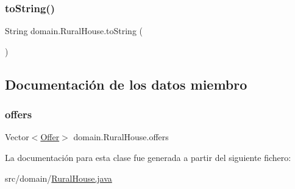 \mbox{\label{classdomain_1_1_rural_house_a2937650ac9e726b75be724d264fa1bee}} 
\subsubsection{\texorpdfstring{toString()}{toString()}}
{\footnotesize\ttfamily String domain.\+Rural\+House.\+to\+String (\begin{DoxyParamCaption}{ }\end{DoxyParamCaption})}



\subsection{Documentación de los datos miembro}
\mbox{\label{classdomain_1_1_rural_house_a3988c813bc7b8918e515b161bc3cdd20}} 
\subsubsection{\texorpdfstring{offers}{offers}}
{\footnotesize\ttfamily Vector$<$\mbox{\hyperlink{classdomain_1_1_offer}{Offer}}$>$ domain.\+Rural\+House.\+offers}



La documentación para esta clase fue generada a partir del siguiente fichero\+:\begin{DoxyCompactItemize}
\item 
src/domain/\mbox{\hyperlink{_rural_house_8java}{Rural\+House.\+java}}\end{DoxyCompactItemize}
